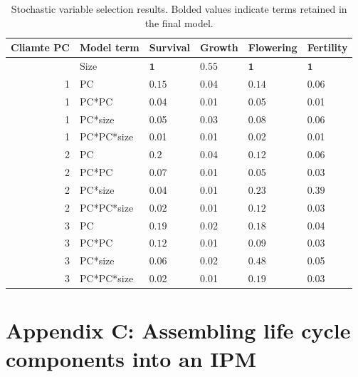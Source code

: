 \documentclass[12pt]{article}\usepackage[]{graphicx}\usepackage[]{color}
\begin{document}
\begin{table}[ht]
\centering
\begin{tabular}{rlllll}
  \hline
Cliamte PC & Model term & Survival & Growth & Flowering & Fertility \\ 
  \hline
 & Size & $\mathbf{1}$ & $\mathbf{0.55}$ & $\mathbf{1}$ & $\mathbf{1}$ \\ 
    1 & PC & $\mathbf{0.15}$ & 0.04 & $\mathbf{0.14}$ & 0.06 \\ 
    1 & PC*PC & 0.04 & 0.01 & 0.05 & 0.01 \\ 
    1 & PC*size & 0.05 & 0.03 & 0.08 & 0.06 \\ 
    1 & PC*PC*size & 0.01 & 0.01 & 0.02 & 0.01 \\ 
    2 & PC & $\mathbf{0.2}$ & 0.04 & $\mathbf{0.12}$ & 0.06 \\ 
    2 & PC*PC & 0.07 & 0.01 & 0.05 & 0.03 \\ 
    2 & PC*size & 0.04 & 0.01 & $\mathbf{0.23}$ & $\mathbf{0.39}$ \\ 
    2 & PC*PC*size & 0.02 & 0.01 & $\mathbf{0.12}$ & 0.03 \\ 
    3 & PC & $\mathbf{0.19}$ & 0.02 & $\mathbf{0.18}$ & 0.04 \\ 
    3 & PC*PC & $\mathbf{0.12}$ & 0.01 & 0.09 & 0.03 \\ 
    3 & PC*size & 0.06 & 0.02 & $\mathbf{0.48}$ & 0.05 \\ 
    3 & PC*PC*size & 0.02 & 0.01 & $\mathbf{0.19}$ & 0.03 \\ 
   \hline
\end{tabular}
\caption{Stochastic variable selection results. Bolded values indicate terms retained in the final model.} 
\label{tab:SVS}
\end{table}



\newpage
\section*{Appendix C: Assembling life cycle components into an IPM}
\end{document}
